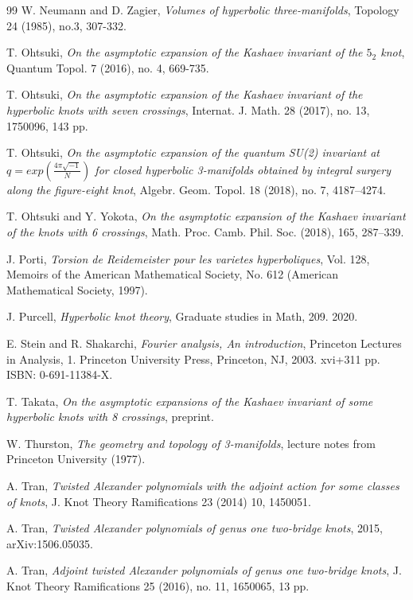 \documentclass[12pt]{amsart}
\begin{document}
\begin{thebibliography}{99}
 W. Neumann and D. Zagier, {\em Volumes of hyperbolic three-manifolds}, Topology 24 (1985), no.3, 307-332.

  T. Ohtsuki, {\em On the asymptotic expansion of the Kashaev invariant of the $5_2$ knot}, Quantum Topol.
7 (2016), no. 4, 669-735.

 T. Ohtsuki, {\em On the asymptotic expansion of the Kashaev invariant of the hyperbolic knots with seven crossings},
Internat. J. Math. 28 (2017), no. 13, 1750096, 143 pp.


 T. Ohtsuki, {\em On the asymptotic expansion of the quantum SU(2) invariant at $q=exp(\frac{4\pi\sqrt{-1}}{N})$
for closed hyperbolic 3-manifolds obtained by integral surgery along the figure-eight knot}, Algebr. Geom. Topol. 18 (2018), no. 7, 4187–4274.

 T. Ohtsuki and Y. Yokota, {\em On the asymptotic expansion of the Kashaev invariant of the knots with 6 crossings}, Math. Proc. Camb. Phil. Soc. (2018), 165, 287–339.

 J. Porti, {\em Torsion de Reidemeister pour les varietes hyperboliques}, Vol. 128, Memoirs of the American Mathematical Society, No. 612 (American Mathematical Society, 1997).

 J. Purcell, {\em Hyperbolic knot theory}, Graduate studies in Math, 209. 2020.


  E. Stein and R. Shakarchi, {\em Fourier analysis, An introduction}, Princeton Lectures in Analysis, 1.
Princeton University Press, Princeton, NJ, 2003. xvi+311 pp. ISBN: 0-691-11384-X.

 T. Takata, {\em On the asymptotic expansions of the Kashaev invariant of some hyperbolic knots with 8
crossings}, preprint.

 W. Thurston, {\em The geometry and topology of 3-manifolds}, lecture notes from Princeton University (1977).

 A. Tran, { \em Twisted Alexander polynomials with the adjoint action for some classes of knots}, J. Knot Theory Ramifications 23 (2014) 10, 1450051.

 A. Tran, {\em Twisted Alexander polynomials of genus one two-bridge knots},
2015, arXiv:1506.05035.

 A. Tran, {\em Adjoint twisted Alexander polynomials of genus one two-bridge knots},
J. Knot Theory Ramifications 25 (2016), no. 11, 1650065, 13 pp.



\end{thebibliography}
\end{document}
